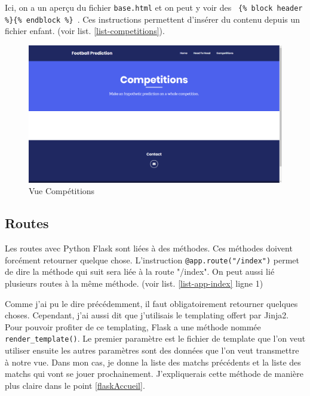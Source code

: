 \documentclass[a4paper,14pt]{extarticle}
\begin{document}
{Ici, on a un aperçu du fichier \texttt{base.html} et on peut y voir des \texttt{ \{\% block header \%\}\{\% endblock \%\} }. Ces instructions permettent d'insérer du contenu depuis un fichier enfant. (voir list.  \ref{list-competitions}).



\begin{figure}[htp]
    \centering
    \includegraphics[width=15cm]{../img/apercuVueCompetitions.png}
    \caption{Vue Compétitions}
    \label{fig:vueCompetitions}
\end{figure}

\subsection{Routes}

Les routes avec Python Flask sont liées à des méthodes. Ces méthodes doivent forcément retourner quelque chose. L'instruction \texttt{@app.route("/index")} permet de dire la méthode qui suit sera liée à la route "/index". On peut aussi lié plusieurs routes à la même méthode. (voir list. \ref{list-app-index} ligne 1)


Comme j'ai pu le dire précédemment, il faut obligatoirement retourner quelques choses. Cependant, j'ai aussi dit que j'utilisais le templating offert par Jinja2. Pour pouvoir profiter de ce templating, Flask a une méthode nommée \texttt{render\_template()}. Le premier paramètre est le fichier de template que l'on veut utiliser ensuite les autres paramètres sont des données que l'on veut transmettre à notre vue. Dans mon cas, je donne la liste des matchs précédents et la liste des matchs qui vont se jouer prochainement. J'expliquerais cette méthode de manière plus claire dans le point \ref{flaskAccueil}.

}
\end{document}
